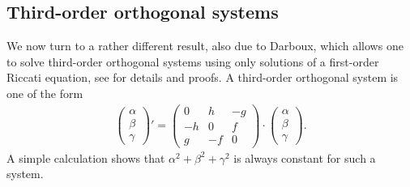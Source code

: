 \documentclass[pdftex]{sigma}%
\numberwithin{equation}{section}
\begin{document}
\subsection{Third-order orthogonal systems}
We now turn to a rather different result, also due to Darboux, which allows one to solve third-order orthogonal systems using only solutions of a first-order Riccati equation, see
\cite[Part~I, Chapter~II]{da3} for details and proofs.
A third-order orthogonal system is one of the form
\begin{gather*}
 \begin{pmatrix} \alpha \\ \beta \\ \gamma \end{pmatrix}' = \begin{pmatrix} 0 & h & -g \\ -h & 0 & f \\ g & -f & 0 \end{pmatrix} \cdot \begin{pmatrix} \alpha \\ \beta \\ \gamma \end{pmatrix}\!.
\end{gather*}
A simple calculation shows that $\alpha^2+\beta^2+\gamma^2$ is always constant for such a system.
\end{document}
